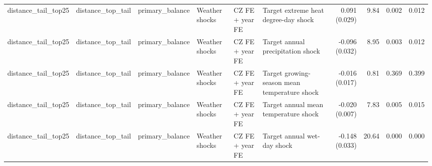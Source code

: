 \begin{tabular}{llllllrrrr}
distance_tail_top25 & distance_top_tail & primary_balance & Weather shocks & CZ FE + year FE & Target extreme heat degree-day shock & 0.091 (0.029) & 9.84 & 0.002 & 0.012 \\
distance_tail_top25 & distance_top_tail & primary_balance & Weather shocks & CZ FE + year FE & Target annual precipitation shock & -0.096 (0.032) & 8.95 & 0.003 & 0.012 \\
distance_tail_top25 & distance_top_tail & primary_balance & Weather shocks & CZ FE + year FE & Target growing-season mean temperature shock & -0.016 (0.017) & 0.81 & 0.369 & 0.399 \\
distance_tail_top25 & distance_top_tail & primary_balance & Weather shocks & CZ FE + year FE & Target annual mean temperature shock & -0.020 (0.007) & 7.83 & 0.005 & 0.015 \\
distance_tail_top25 & distance_top_tail & primary_balance & Weather shocks & CZ FE + year FE & Target annual wet-day shock & -0.148 (0.033) & 20.64 & 0.000 & 0.000 \\
\bottomrule
\end{tabular}
